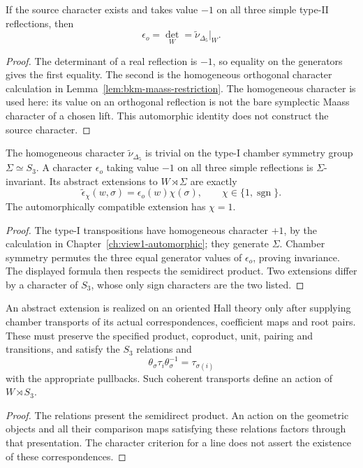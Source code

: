 \begin{proposition}
\label{prop:orientation-character-determinant-criterion}
\label{prop:orientation-character-maass-criterion}
If the source character exists and takes value \(-1\) on all three
simple type-II reflections, then
\[
 \epsilon_o=\det_W
 =\widetilde\nu_{\Delta_5}|_W.
\]
\end{proposition}
\begin{proof}
The determinant of a real reflection is \(-1\), so equality on the
generators gives the first equality.  The second is the homogeneous
orthogonal character calculation in
Lemma~\ref{lem:bkm-maass-restriction}.  The homogeneous character is
used here: its value on an orthogonal reflection is not the bare
symplectic Maass character of a chosen lift.  This automorphic
identity does not construct the source character.
\end{proof}

\begin{proposition}
\label{prop:s3-chamber-maass-triviality}
\label{prop:orientation-character-s3-extension-decision}
The homogeneous character \(\widetilde\nu_{\Delta_5}\) is trivial
on the type-I chamber symmetry group \(\Sigma\simeq S_3\).
A character \(\epsilon_o\) taking value \(-1\) on all three simple
reflections is \(\Sigma\)-invariant.  Its abstract extensions to
\(W\rtimes\Sigma\) are exactly
\[
 \widetilde\epsilon_\chi(w,\sigma)=\epsilon_o(w)\chi(\sigma),
 \qquad \chi\in\{1,\operatorname{sgn}\}.
\]
The automorphically compatible extension has \(\chi=1\).
\end{proposition}
\begin{proof}
The type-I transpositions have homogeneous character \(+1\), by the
calculation in Chapter~\ref{ch:view1-automorphic}; they generate
\(\Sigma\).  Chamber symmetry permutes the three equal generator
values of \(\epsilon_o\), proving invariance.  The displayed formula
then respects the semidirect product.  Two extensions differ by a
character of \(S_3\), whose only sign characters are the two listed.
\end{proof}

\begin{proposition}
\label{prop:semidirect-hall-lift-construction-criterion}
An abstract extension is realized on an oriented Hall theory only
after supplying chamber transports of its actual correspondences,
coefficient maps and root pairs.  These must preserve the specified
product, coproduct, unit, pairing and transitions, and satisfy the
\(S_3\) relations and
\[
 \theta_\sigma\tau_i\theta_\sigma^{-1}
 =\tau_{\sigma(i)}
\]
with the appropriate pullbacks.  Such coherent transports define
an action of \(W\rtimes S_3\).
\end{proposition}
\begin{proof}
The relations present the semidirect product.  An action on the
geometric objects and all their comparison maps satisfying these
relations factors through that presentation.  The character criterion
for a line does not assert the existence of these correspondences.
\end{proof}

